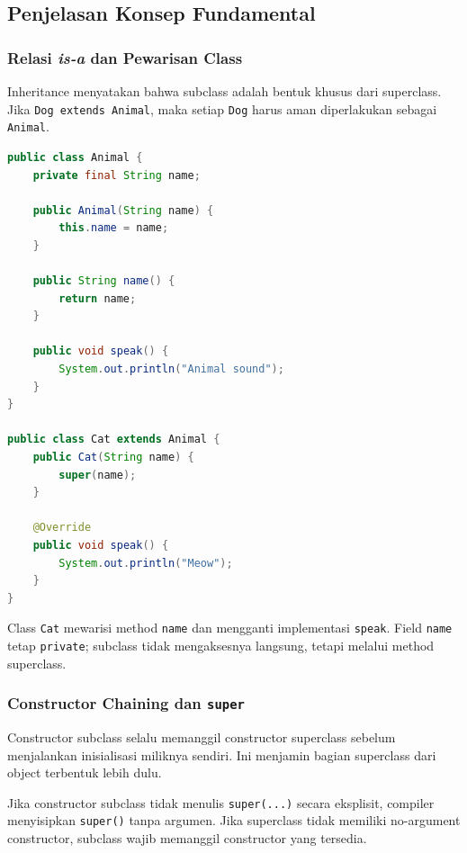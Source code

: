 \subsection{Penjelasan Konsep Fundamental}

\subsubsection{Relasi \textit{is-a} dan Pewarisan Class}

\begin{jawab}
Inheritance menyatakan bahwa subclass adalah bentuk khusus dari superclass. Jika \texttt{Dog extends Animal}, maka setiap \texttt{Dog} harus aman diperlakukan sebagai \texttt{Animal}.
\end{jawab}

\begin{lstlisting}[language=Java, caption={Inheritance dasar di Java}, label={lst:inheritance-basic}]
public class Animal {
    private final String name;

    public Animal(String name) {
        this.name = name;
    }

    public String name() {
        return name;
    }

    public void speak() {
        System.out.println("Animal sound");
    }
}

public class Cat extends Animal {
    public Cat(String name) {
        super(name);
    }

    @Override
    public void speak() {
        System.out.println("Meow");
    }
}
\end{lstlisting}

Class \texttt{Cat} mewarisi method \texttt{name} dan mengganti implementasi \texttt{speak}. Field \texttt{name} tetap \texttt{private}; subclass tidak mengaksesnya langsung, tetapi melalui method superclass.

\subsubsection{Constructor Chaining dan \texttt{super}}

\begin{jawab}
Constructor subclass selalu memanggil constructor superclass sebelum menjalankan inisialisasi miliknya sendiri. Ini menjamin bagian superclass dari object terbentuk lebih dulu.
\end{jawab}

Jika constructor subclass tidak menulis \texttt{super(...)} secara eksplisit, compiler menyisipkan \texttt{super()} tanpa argumen. Jika superclass tidak memiliki no-argument constructor, subclass wajib memanggil constructor yang tersedia.

